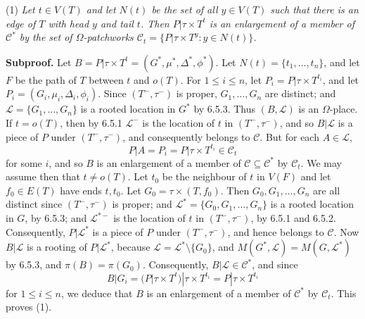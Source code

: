 \hspace*{12pt}(1) \textit{Let $t \in V(T)$ and let $N(t)$ be the set of all $y \in V(T)$ such that there is an edge of $T$ with head $y$ and tail $t$. Then $P|\tau \times T^t$ is an enlargement of a member of $\mathscr{C}^*$ by the set of $\Omega$-patchworks $\mathscr{C}_t = \{P|\tau \times T^y \colon y \in N(t)\}$.}

\textbf{Subproof.} Let $B = P|\tau \times T^t = (G^*, \mu^*, \Delta^*, \phi^*)$. Let $N(t) = \{t_1, \ldots, t_n\}$, and let $F$ be the path of $T$ between $t$ and $o(T)$. For $1 \le i \le n$, let $P_i = P|\tau \times T^{t_i}$, and let $P_i = (G_i, \mu_i, \Delta_i, \phi_i)$. Since $(T^-, \tau^-)$ is proper, $G_1, \ldots, G_n$ are distinct; and $\mathscr{L} = \{G_1, \ldots, G_n\}$ is a rooted location in $G^*$ by 6.5.3. Thus $(B, \mathscr{L})$ is an $\Omega$-place. If $t = o(T)$, then by 6.5.1 $\mathscr{L}^-$ is the location of $t$ in $(T^-, \tau^-)$, and so $B|\mathscr{L}$ is a piece of $P$ under $(T^-, \tau^-)$, and consequently belongs to $\mathscr{C}$. But for each $A \in \mathscr{L}$,
\begin{equation*}
P|A = P_i = P|\tau \times T^{t_i} \in \mathscr{C}_t
\end{equation*}
for some $i$, and so $B$ is an enlargement of a member of $\mathscr{C} \subseteq \mathscr{C}^*$ by $\mathscr{C}_t$. We may assume then that $t \ne o(T)$. Let $t_0$ be the neighbour of $t$ in $V(F)$ and let $f_0 \in E(T)$ have ends $t, t_0$. Let $G_0 = \tau \times (T, f_0)$. Then $G_0, G_1, \ldots, G_n$ are all distinct since $(T^-, \tau^-)$ is proper; and $\mathscr{L}^* = \{G_0, G_1, \ldots, G_n\}$ is a rooted location in $G$, by 6.5.3; and $\mathscr{L}^{*-}$ is the location of $t$ in $(T^-, \tau^-)$, by 6.5.1 and 6.5.2. Consequently, $P|\mathscr{L}^*$ is a piece of $P$ under $(T^-, \tau^-)$, and hence belongs to $\mathscr{C}$. Now $B|\mathscr{L}$ is a rooting of $P|\mathscr{L}^*$, because $\mathscr{L} = \mathscr{L}^* \setminus \{G_0\}$, and $M(G^*, \mathscr{L}) = M(G, \mathscr{L}^*)$ by 6.5.3, and $\pi(B) = \pi(G_0)$. Consequently, $B|\mathscr{L} \in \mathscr{C}^*$, and since
\begin{equation*}
B|G_i = (P|\tau \times T^t)|\tau \times T^{t_i} = P|\tau \times T^{t_i}
\end{equation*}
for $1 \le i \le n$, we deduce that $B$ is an enlargement of a member of $\mathscr{C}^*$ by $\mathscr{C}_t$. This proves (1).

